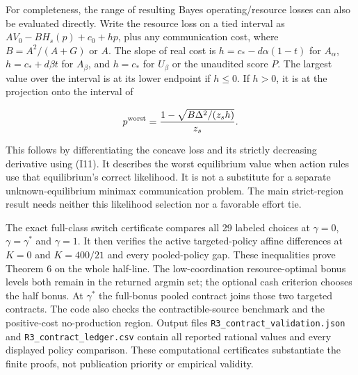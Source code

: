 \documentclass[
  11pt,
]{article}
\begin{document}
For completeness, the range of resulting Bayes operating/resource losses
can also be evaluated directly. Write the resource loss on a tied
interval as \(AV_0-BH_s(p)+c_0+h p\), plus any communication cost, where
\(B=A^2/(A+G)\) or \(A\). The slope of real cost is
\(h=c_*-d\alpha(1-t)\) for \(A_\alpha\), \(h=c_*+d\beta t\) for
\(A_\beta\), and \(h=c_*\) for \(U_\beta\) or the unaudited score \(P\).
The largest value over the interval is at its lower endpoint if
\(h\leq0\). If \(h>0\), it is at the projection onto the interval of

\[p^{\rm worst}=\frac{1-\sqrt{B\Delta^2/(z_s h)}}{z_s}.\]

This follows by differentiating the concave loss and its strictly
decreasing derivative using (I11). It describes the worst equilibrium
value when action rules use that equilibrium's correct likelihood. It is
not a substitute for a separate unknown-equilibrium minimax
communication problem. The main strict-region result needs neither this
likelihood selection nor a favorable effort tie.

The exact full-class switch certificate compares all 29 labeled choices
at \(\gamma=0\), \(\gamma=\gamma^*\) and \(\gamma=1\). It then verifies
the active targeted-policy affine differences at \(K=0\) and
\(K=400/21\) and every pooled-policy gap. These inequalities prove
Theorem 6 on the whole half-line. The low-coordination resource-optimal
bonus levels both remain in the returned argmin set; the optional cash
criterion chooses the half bonus. At \(\gamma^*\) the full-bonus pooled
contract joins those two targeted contracts. The code also checks the
contractible-source benchmark and the positive-cost no-production
region. Output files \texttt{R3\_contract\_validation.json} and
\texttt{R3\_contract\_ledger.csv} contain all reported rational values
and every displayed policy comparison. These computational certificates
substantiate the finite proofs, not publication priority or empirical
validity.
\end{document}
